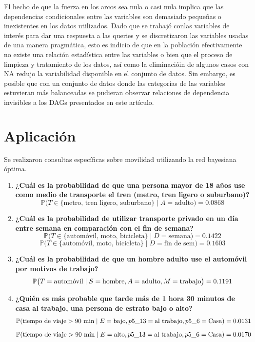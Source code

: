 \documentclass[twocolumn]{article}
\begin{document}
    
 El hecho de que la fuerza en los arcos sea nula o casi nula implica que las dependencias condicionales entre las variables son demasiado pequeñas o inexistentes en los datos utilizados. Dado que se trabajó conlas variables de interés para dar una respuesta a las queries y se discretizaron las variables usadas de una manera pragmática, esto es indicio de que en la población efectivamente no existe una relación estadística entre las variables o bien que el proceso de limpieza y tratamiento de los datos, así como la eliminacióin de algunos casos con NA redujo la variabilidad disponible en el conjunto de datos. Sin embargo, es posible que con un conjunto de datos donde las categorías de las variables estuvieran más balanceadas se pudieran observar relaciones de dependencia invisibles a los DAGs presentados en este artículo. 
 
\section{Aplicación}
Se realizaron consultas específicas sobre movilidad utilizando la red bayesiana óptima.
\begin{enumerate}
    \item \textbf{¿Cuál es la probabilidad de que una persona mayor de 18 años use como medio de transporte el tren (metro, tren ligero o suburbano)?}  
    {\footnotesize \[
    \mathbb{P}\big(T \in \{\text{metro, tren ligero, suburbano}\} \mid A = \text{adulto}\big) = 0.0868
    \]}
    
    \item \textbf{¿Cuál es la probabilidad de utilizar transporte privado en un día entre semana en comparación con el fin de semana?}  
    {\footnotesize \[
    \mathbb{P}\big(T \in \{\text{automóvil, moto, bicicleta}\} \mid D = \text{semana}\big) = 0.1422
    \]}
    {\footnotesize \[
    \mathbb{P}\big(T \in \{\text{automóvil, moto, bicicleta}\} \mid D = \text{fin de sem}\big) = 0.1603
    \]}
    
    \item \textbf{¿Cuál es la probabilidad de que un hombre adulto use el automóvil por motivos de trabajo?}  
        \[
        \resizebox{0.85\columnwidth}{!}{$
        \mathbb{P}\big(T = \text{automóvil} \mid S = \text{hombre}, A = \text{adulto}, M = \text{trabajo}\big) = 0.1191
        $}
        \]

    
    \item \textbf{¿Quién es más probable que tarde más de 1 hora 30 minutos de casa al trabajo, una persona de estrato bajo o alto?}  
    {\footnotesize
    \[
    \resizebox{\columnwidth}{!}{$
    \mathbb{P}(\text{tiempo de viaje} > 90\ \text{min} \mid E = \text{bajo}, p5\_13 = \text{al trabajo}, p5\_6 = \text{Casa}) = 0.0131
    $}
    \]
    \[
    \resizebox{\columnwidth}{!}{$
    \mathbb{P}(\text{tiempo de viaje} > 90\ \text{min} \mid E = \text{alto}, p5\_13 = \text{al trabajo}, p5\_6 = \text{Casa}) = 0.0170
    $}
    \]
    }

\end{enumerate}
\end{document}
